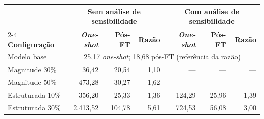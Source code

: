 \begin{tabular}{l rrr rrr}
\hline
& \multicolumn{3}{c}{\textbf{Sem análise de sensibilidade}} & \multicolumn{3}{c}{\textbf{Com análise de sensibilidade}} \\
\cline{2-4} \cline{5-7}
\textbf{Configuração} & \textbf{\textit{One-shot}} & \textbf{Pós-FT} & \textbf{Razão} & \textbf{\textit{One-shot}} & \textbf{Pós-FT} & \textbf{Razão} \\
\hline
Modelo base & \multicolumn{6}{c}{25,17 \textit{one-shot}; 18,68 pós-FT (referência da razão)} \\
\addlinespace
Magnitude 30\% & 36,42 & 20,54 & 1,10 & --- & --- & --- \\
Magnitude 50\% & 473,28 & 30,27 & 1,62 & --- & --- & --- \\
Estruturada 10\% & 356,20 & 25,33 & 1,36 & 124,29 & 25,96 & 1,39 \\
Estruturada 30\% & 2.413,52 & 104,78 & 5,61 & 724,53 & 56,08 & 3,00 \\
\hline
\end{tabular}
